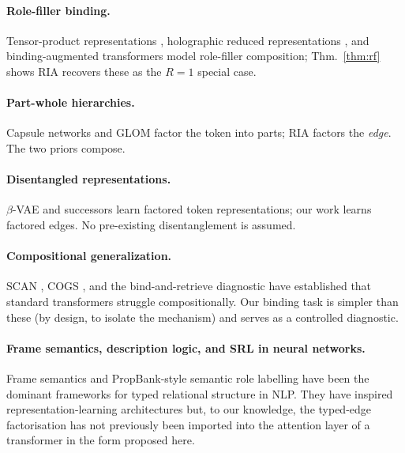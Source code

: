 \documentclass{article}
\begin{document}
\paragraph{Role-filler binding.} Tensor-product representations
\citep{smolensky1990tensor}, holographic reduced representations
\citep{plate1995holographic}, and binding-augmented transformers
\citep{schlag2019enhancing, schlag2021linear} model role-filler
composition; Thm.~\ref{thm:rf} shows RIA recovers these as the $R{=}1$
special case.

\paragraph{Part-whole hierarchies.} Capsule networks
\citep{sabour2017dynamic} and GLOM \citep{hinton2021glom} factor the
token into parts; RIA factors the \emph{edge}. The two priors
compose.

\paragraph{Disentangled representations.} $\beta$-VAE
\citep{higgins2017beta} and successors learn factored token
representations; our work learns factored edges. No pre-existing
disentanglement is assumed.

\paragraph{Compositional generalization.} SCAN \citep{lake2018scan},
COGS \citep{kim2020cogs}, and the bind-and-retrieve diagnostic
\citep{webb2020emergent, russin2019compositional} have established that
standard transformers struggle compositionally. Our binding task is
simpler than these (by design, to isolate the mechanism) and serves as
a controlled diagnostic.

\paragraph{Frame semantics, description logic, and SRL in neural
networks.} Frame semantics \citep{fillmore1976,baker1998framenet} and
PropBank-style semantic role labelling \citep{palmer2005propbank,
gildea2002automatic} have been the dominant frameworks for typed
relational structure in NLP. They have inspired
representation-learning architectures
\citep{russin2019compositional, webb2020emergent} but, to our
knowledge, the typed-edge factorisation has not previously been
imported into the attention layer of a transformer in the form
proposed here.
\end{document}
